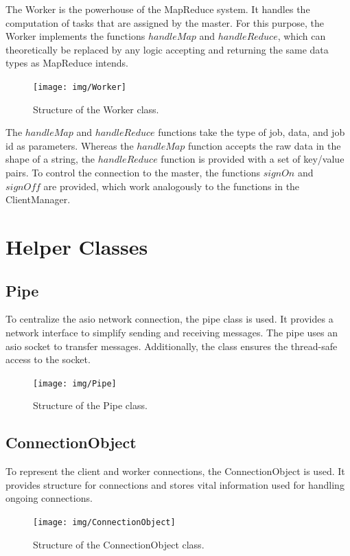 \documentclass[12pt, letterpaper]{article}
\begin{document}
The Worker is the powerhouse of the MapReduce system. It handles the computation of tasks that are assigned by the master. For this purpose, the Worker implements the functions $handleMap$ and $handleReduce$, which can theoretically be replaced by any logic accepting and returning the same data types as MapReduce intends. 

\begin{figure}[h]
 	\centering
 	\texttt{[image: img/Worker]}
 	\caption{Structure of the Worker class.}
 	\label{fig:classes_Worker}
\end{figure}

The $handleMap$ and $handleReduce$ functions take the type of job, data, and job id as parameters. Whereas the $handleMap$ function accepts the raw data in the shape of a string, the $handleReduce$ function is provided with a set of key/value pairs.\newline
To control the connection to the master, the functions $signOn$ and $signOff$ are provided, which work analogously to the functions in the ClientManager.

\section{Helper Classes}

\subsection{Pipe}

To centralize the asio network connection, the pipe class is used. It provides a network interface to simplify sending and receiving messages. The pipe uses an asio socket to transfer messages. Additionally, the class ensures the thread-safe access to the socket. 

\begin{figure}[h]
	\centering
	\texttt{[image: img/Pipe]}
	\caption{Structure of the Pipe class.}
	\label{fig:classes_Pipe}
\end{figure}

\subsection{ConnectionObject}

To represent the client and worker connections, the ConnectionObject is used. It provides structure for connections and stores vital information used for handling ongoing connections. 

\begin{figure}[h]
	\centering
	\texttt{[image: img/ConnectionObject]}
	\caption{Structure of the ConnectionObject class.}
	\label{fig:classes_ConnectionObject}
\end{figure}
\end{document}
